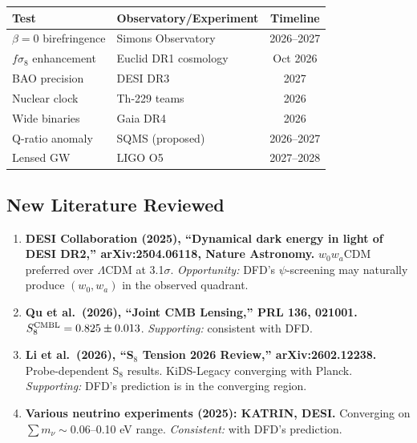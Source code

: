 \documentclass[11pt]{article}
\newcommand{\LCDM}{$\Lambda$CDM}
\begin{document}
\begin{center}
\begin{tabular}{llc}
\toprule
\textbf{Test} & \textbf{Observatory/Experiment} & \textbf{Timeline} \\
\midrule
$\beta = 0$ birefringence & Simons Observatory & 2026--2027 \\
$f\sigma_8$ enhancement & Euclid DR1 cosmology & Oct 2026 \\
BAO precision & DESI DR3 & 2027 \\
Nuclear clock & Th-229 teams & 2026 \\
Wide binaries & Gaia DR4 & 2026 \\
Q-ratio anomaly & SQMS (proposed) & 2026--2027 \\
Lensed GW & LIGO O5 & 2027--2028 \\
\bottomrule
\end{tabular}
\end{center}

\subsection{New Literature Reviewed}

\begin{tcolorbox}[colback=green!5!white, colframe=green!50!black,
  title=\textbf{Agent 15: NEW LITERATURE REVIEWED}]

\begin{enumerate}

\item \textbf{DESI Collaboration (2025), ``Dynamical dark energy in
  light of DESI DR2,'' arXiv:2504.06118, Nature Astronomy.}
  $w_0w_a$CDM preferred over \LCDM{} at 3.1$\sigma$. \emph{Opportunity:}
  DFD's $\psi$-screening may naturally produce $(w_0, w_a)$ in the
  observed quadrant.

\item \textbf{Qu et al.\ (2026), ``Joint CMB Lensing,'' PRL 136, 021001.}
  $S_8^{\rm CMBL} = 0.825 \pm 0.013$. \emph{Supporting:} consistent
  with DFD.

\item \textbf{Li et al.\ (2026), ``S$_8$ Tension 2026 Review,''
  arXiv:2602.12238.}
  Probe-dependent S$_8$ results. KiDS-Legacy converging with Planck.
  \emph{Supporting:} DFD's prediction is in the converging region.

\item \textbf{Various neutrino experiments (2025): KATRIN, DESI.}
  Converging on $\sum m_\nu \sim 0.06$--0.10 eV range.
  \emph{Consistent:} with DFD's prediction.

\end{enumerate}
\end{tcolorbox}
\end{document}

